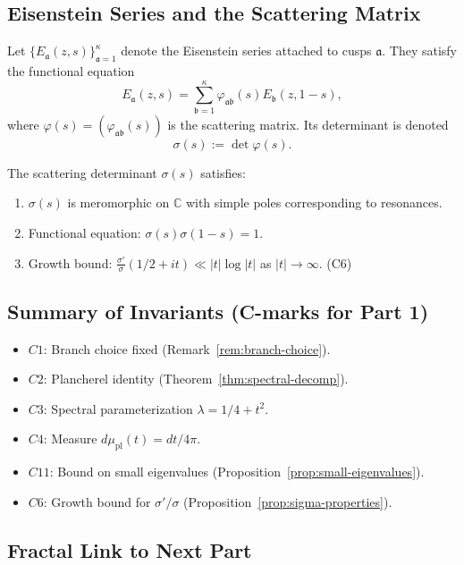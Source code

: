 \subsection{Eisenstein Series and the Scattering Matrix}

Let $\{E_{\mathfrak{a}}(z, s)\}_{\mathfrak{a}=1}^\kappa$ denote the Eisenstein series attached to cusps $\mathfrak{a}$. They satisfy the functional equation
\[
E_{\mathfrak{a}}(z,s) = \sum_{\mathfrak{b}=1}^\kappa \varphi_{\mathfrak{a}\mathfrak{b}}(s) E_{\mathfrak{b}}(z,1-s),
\]
where $\varphi(s) = (\varphi_{\mathfrak{a}\mathfrak{b}}(s))$ is the scattering matrix. Its determinant is denoted
\[
\sigma(s) := \det \varphi(s).
\]

\begin{proposition}
\label{prop:sigma-properties}
The scattering determinant $\sigma(s)$ satisfies:
\begin{enumerate}
  \item $\sigma(s)$ is meromorphic on $\mathbb{C}$ with simple poles corresponding to resonances.
  \item Functional equation: $\sigma(s)\sigma(1-s)=1$.
  \item Growth bound: $\frac{\sigma'}{\sigma}(1/2+it) \ll |t|\log|t|$ as $|t|\to\infty$. (C6)
\end{enumerate}
\end{proposition}

\subsection{Summary of Invariants (C-marks for Part 1)}

\begin{itemize}
  \item $C1$: Branch choice fixed (Remark~\ref{rem:branch-choice}).
  \item $C2$: Plancherel identity (Theorem~\ref{thm:spectral-decomp}).
  \item $C3$: Spectral parameterization $\lambda = 1/4+t^2$.
  \item $C4$: Measure $d\mu_{\mathrm{pl}}(t)=dt/4\pi$.
  \item $C11$: Bound on small eigenvalues (Proposition~\ref{prop:small-eigenvalues}).
  \item $C6$: Growth bound for $\sigma'/\sigma$ (Proposition~\ref{prop:sigma-properties}).
\end{itemize}

\subsection*{Fractal Link to Next Part}

